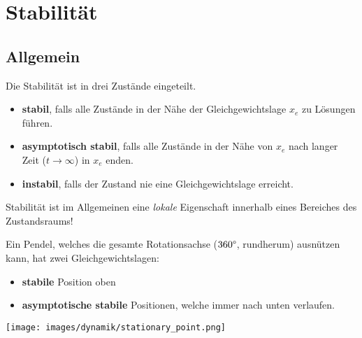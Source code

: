 \documentclass[
  10pt,
  a4paper,
  twocolumn]{article}
\providecommand{\tightlist}{%
  \setlength{\itemsep}{0pt}\setlength{\parskip}{0pt}}\usepackage{longtable,booktabs,array}
\numberwithin{equation}{section}
\begin{document}
\section{Stabilität}\label{stabilituxe4t}

\subsection{Allgemein}\label{allgemein}

Die Stabilität ist in drei Zustände eingeteilt.

\begin{itemize}
\tightlist
\item
  \textbf{stabil}, falls alle Zustände in der Nähe der
  Gleichgewichtslage \(x_e\) zu Lösungen führen.
\item
  \textbf{asymptotisch stabil}, falls alle Zustände in der Nähe von
  \(x_e\) nach langer Zeit (\(t \rightarrow \infty\)) in \(x_e\) enden.
\item
  \textbf{instabil}, falls der Zustand nie eine Gleichgewichtslage
  erreicht.
\end{itemize}

Stabilität ist im Allgemeinen eine \emph{lokale} Eigenschaft innerhalb
eines Bereiches des Zustandsraums!

\begin{tcolorbox}[enhanced jigsaw, coltitle=black, colback=white, breakable, colframe=quarto-callout-note-color-frame, rightrule=.15mm, left=2mm, opacityback=0, leftrule=.75mm, toptitle=1mm, colbacktitle=quarto-callout-note-color!10!white, bottomtitle=1mm, arc=.35mm, bottomrule=.15mm, title=\textcolor{quarto-callout-note-color}{\faInfo}\hspace{0.5em}{Beispiel}, titlerule=0mm, toprule=.15mm, opacitybacktitle=0.6]

Ein Pendel, welches die gesamte Rotationsachse (\(360\degree\),
rundherum) ausnützen kann, hat zwei Gleichgewichtslagen:

\begin{itemize}
\tightlist
\item
  \textbf{stabile} Position oben
\item
  \textbf{asymptotische stabile} Positionen, welche immer nach unten
  verlaufen.
\end{itemize}

\begin{center}
\texttt{[image: images/dynamik/stationary\_point.png]}
\end{center}

\end{tcolorbox}
\end{document}
